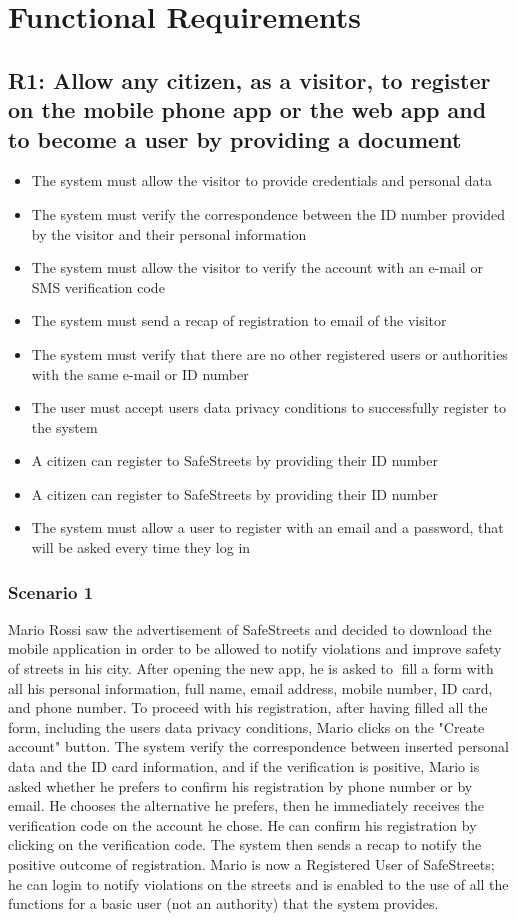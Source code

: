 \section{Functional Requirements}

\subsection{R1: Allow any citizen, as a visitor, to register on the mobile phone app or the web app and to become a user by providing a document}
\begin{itemize}
    \item The system must allow the visitor to provide credentials and personal data
    \item The system must verify the correspondence between the ID number provided by the visitor and their personal information
    \item The system must allow the visitor to verify the account with an e-mail or SMS verification code
    \item The system must send a recap of registration to email of the visitor
    \item The system must verify that there are no other registered users or authorities with the same e-mail or ID number
    \item The user must accept users data privacy conditions to successfully register to the system
    \item A citizen can register to SafeStreets by providing their ID number
    \item A citizen can register to SafeStreets by providing their ID number
    \item The system must allow a user to register with an email and a password, that will be asked every time they log in
\end{itemize}

\subsubsection{Scenario 1}
Mario Rossi saw the advertisement of SafeStreets and decided to download the mobile application in order to be allowed to notify violations and improve safety of streets in his city. After
opening the new app, he is asked to fill a form with all his personal information, full name, email address, mobile number, ID card, and phone number. To proceed with his
registration, after having filled all the form, including the users data privacy conditions, Mario clicks on the "Create account" button. The system verify the correspondence between inserted personal data and the ID card information,
and if the verification is positive, Mario is asked whether he prefers to confirm his registration by phone number or by email.
He chooses the alternative he prefers, then he immediately receives the verification code on the account he chose.
He can confirm his registration by clicking on the verification code. The system then sends a recap to notify the positive outcome of registration. Mario is now a Registered
User of SafeStreets; he can login to notify violations on the streets and is enabled to the use of all the functions for a basic user (not an authority) that the system provides.

